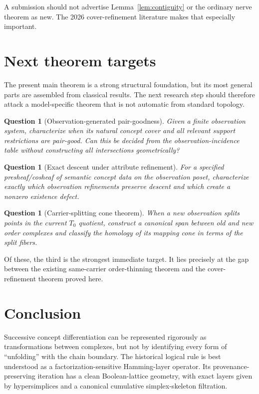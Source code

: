 \documentclass[11pt]{article}
\newtheorem{question}[theorem]{Question}
\begin{document}
A submission should not advertise Lemma~\ref{lem:contiguity} or the ordinary nerve theorem as new.  The 2026 cover-refinement literature makes that especially important.

\section{Next theorem targets}

The present main theorem is a strong structural foundation, but its most general parts are assembled from classical results.  The next research step should therefore attack a model-specific theorem that is not automatic from standard topology.

\begin{question}[Observation-generated pair-goodness]
Given a finite observation system, characterize when its natural concept cover and all relevant support restrictions are pair-good.  Can this be decided from the observation-incidence table without constructing all intersections geometrically?
\end{question}

\begin{question}[Exact descent under attribute refinement]
For a specified presheaf/cosheaf of semantic concept data on the observation poset, characterize exactly which observation refinements preserve descent and which create a nonzero existence defect.
\end{question}

\begin{question}[Carrier-splitting cone theorem]
When a new observation splits points in the current $T_0$ quotient, construct a canonical span between old and new order complexes and classify the homology of its mapping cone in terms of the split fibers.
\end{question}

Of these, the third is the strongest immediate target.  It lies precisely at the gap between the existing same-carrier order-thinning theorem and the cover-refinement theorem proved here.

\section{Conclusion}

Successive concept differentiation can be represented rigorously as transformations between complexes, but not by identifying every form of ``unfolding'' with the chain boundary.  The historical logical rule is best understood as a factorization-sensitive Hamming-layer operator.  Its provenance-preserving iteration has a clean Boolean-lattice geometry, with exact layers given by hypersimplices and a canonical cumulative simplex-skeleton filtration.
\end{document}
